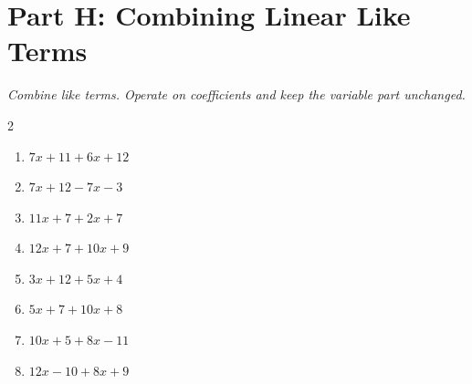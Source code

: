 \documentclass[11pt]{article}
\begin{document}
\section*{Part H: Combining Linear Like Terms}
\noindent\textit{Combine like terms. Operate on coefficients and keep the variable part unchanged.}
\begin{multicols}{2}
\begin{enumerate}
  \item $7x + 11 + 6x + 12$
  \vspace{1.2cm}
  \item $7x + 12 - 7x - 3$
  \vspace{1.2cm}
  \item $11x + 7 + 2x + 7$
  \vspace{1.2cm}
  \item $12x + 7 + 10x + 9$
  \vspace{1.2cm}
  \item $3x + 12 + 5x + 4$
  \vspace{1.2cm}
  \item $5x + 7 + 10x + 8$
  \vspace{1.2cm}
  \item $10x + 5 + 8x - 11$
  \vspace{1.2cm}
  \item $12x - 10 + 8x + 9$
  \vspace{1.2cm}
\end{enumerate}
\end{multicols}
\end{document}
